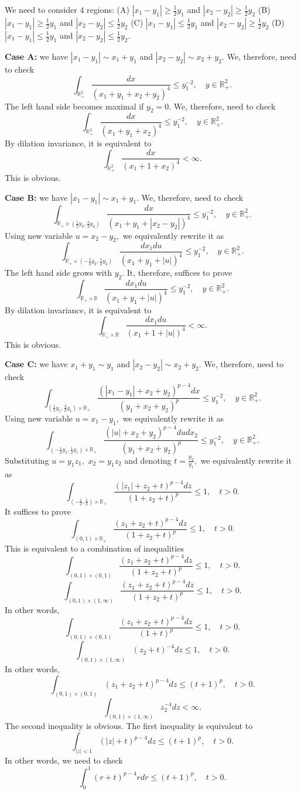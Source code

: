 \documentclass{amsart}
\begin{document}
We need to consider $4$ regions: (A) $|x_1-y_1|\geq\frac12y_1$ and $|x_2-y_2|\geq\frac12y_2$ (B) $|x_1-y_1|\geq\frac12y_1$ and $|x_2-y_2|\leq\frac12y_2$ (C) $|x_1-y_1|\leq\frac12y_1$ and $|x_2-y_2|\geq\frac12y_2$ (D) $|x_1-y_1|\leq\frac12y_1$ and $|x_2-y_2|\leq\frac12y_2.$

{\bf Case A:} we have $|x_1-y_1|\sim x_1+y_1$ and $|x_2-y_2|\sim x_2+y_2.$ We, therefore, need to check
$$\int_{\mathbb{R}^2_+}\frac{dx}{(x_1+y_1+x_2+y_2)^4}\leq y_1^{-2},\quad y\in\mathbb{R}^2_+.$$
The left hand side becomes maximal if $y_2=0.$ We, therefore, need to check
$$\int_{\mathbb{R}^2_+}\frac{dx}{(x_1+y_1+x_2)^4}\leq y_1^{-2},\quad y\in\mathbb{R}^2_+.$$
By dilation invariance, it is equivalent to
$$\int_{\mathbb{R}^2_+}\frac{dx}{(x_1+1+x_2)^4}<\infty.$$
This is obvious.

{\bf Case B:} we have $|x_1-y_1|\sim x_1+y_1.$ We, therefore, need to check
$$\int_{\mathbb{R}_+\times(\frac12y_2,\frac32y_2)}\frac{dx}{(x_1+y_1+|x_2-y_2|)^4}\leq y_1^{-2},\quad y\in\mathbb{R}^2_+.$$
Using new variable $u=x_2-y_2,$ we equivalently rewrite it as
$$\int_{\mathbb{R}_+\times(-\frac12y_2,\frac12y_2)}\frac{dx_1du}{(x_1+y_1+|u|)^4}\leq y_1^{-2},\quad y\in\mathbb{R}^2_+.$$
The left hand side grows with $y_2.$ It, therefore, suffices to prove
$$\int_{\mathbb{R}_+\times\mathbb{R}}\frac{dx_1du}{(x_1+y_1+|u|)^4}\leq y_1^{-2},\quad y\in\mathbb{R}^2_+.$$
By dilation invariance, it is equivalent to
$$\int_{\mathbb{R}_+\times\mathbb{R}}\frac{dx_1du}{(x_1+1+|u|)^4}<\infty.$$
This is obvious.

{\bf Case C:} we have $x_1+y_1\sim y_1$ and $|x_2-y_2|\sim x_2+y_2.$ We, therefore, need to check
$$\int_{(\frac12y_1,\frac32y_1)\times\mathbb{R}_+}\frac{(|x_1-y_1|+x_2+y_2)^{p-4}dx}{(y_1+x_2+y_2)^p}\leq y_1^{-2},\quad y\in\mathbb{R}^2_+.$$
Using new variable $u=x_1-y_1,$ we equivalently rewrite it as
$$\int_{(-\frac12y_1,\frac12y_1)\times\mathbb{R}_+}\frac{(|u|+x_2+y_2)^{p-4}dudx_2}{(y_1+x_2+y_2)^p}\leq y_1^{-2},\quad y\in\mathbb{R}^2_+.$$
Substituting $u=y_1z_1,$ $x_2=y_1z_2$ and denoting $t=\frac{y_2}{y_1},$ we equivalently rewrite it as
$$\int_{(-\frac12,\frac12)\times\mathbb{R}_+}\frac{(|z_1|+z_2+t)^{p-4}dz}{(1+z_2+t)^p}\leq 1,\quad t>0.$$
It suffices to prove
$$\int_{(0,1)\times\mathbb{R}_+}\frac{(z_1+z_2+t)^{p-4}dz}{(1+z_2+t)^p}\leq 1,\quad t>0.$$
This is equivalent to a combination of inequalities
$$\int_{(0,1)\times(0,1)}\frac{(z_1+z_2+t)^{p-4}dz}{(1+z_2+t)^p}\leq 1,\quad t>0.$$
$$\int_{(0,1)\times(1,\infty)}\frac{(z_1+z_2+t)^{p-4}dz}{(1+z_2+t)^p}\leq 1,\quad t>0.$$
In other words,
$$\int_{(0,1)\times(0,1)}\frac{(z_1+z_2+t)^{p-4}dz}{(1+t)^p}\leq 1,\quad t>0.$$
$$\int_{(0,1)\times(1,\infty)}(z_2+t)^{-4}dz\leq 1,\quad t>0.$$
In other words,
$$\int_{(0,1)\times(0,1)}(z_1+z_2+t)^{p-4}dz\leq (t+1)^p,\quad t>0.$$
$$\int_{(0,1)\times(1,\infty)}z_2^{-4}dz<\infty.$$
The second inequality is obvious. The first inequality is equivalent to
$$\int_{|z|<1}(|z|+t)^{p-4}dz\leq (t+1)^p,\quad t>0.$$
In other words, we need to check
$$\int_0^1(r+t)^{p-4}rdr\leq (t+1)^p,\quad t>0.$$
\end{document}
